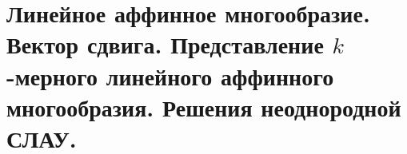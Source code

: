 \section{
    Линейное аффинное многообразие. Вектор сдвига. Представление $k$-мерного линейного аффинного многообразия. Решения неоднородной СЛАУ. 
}




\newpage




